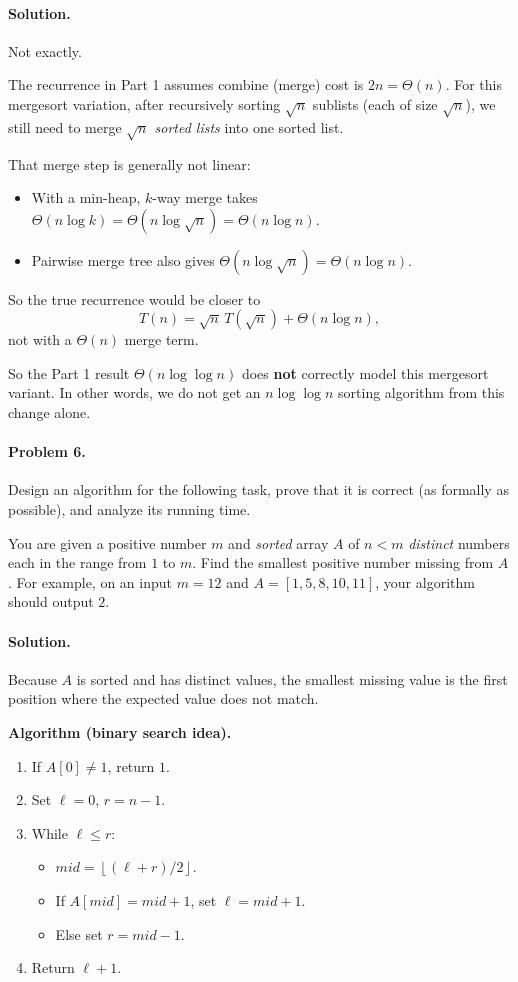 \documentclass[10pt]{article}
\begin{document}
\paragraph{Solution.}
Not exactly.

The recurrence in Part 1 assumes combine (merge) cost is $2n=\Theta(n)$.
For this mergesort variation, after recursively sorting $\sqrt n$ sublists (each of size $\sqrt n$), we still need to merge \emph{$\sqrt n$ sorted lists} into one sorted list.

That merge step is generally not linear:
\begin{itemize}
    \item With a min-heap, $k$-way merge takes $\Theta(n\log k)=\Theta(n\log\sqrt n)=\Theta(n\log n)$.
    \item Pairwise merge tree also gives $\Theta(n\log\sqrt n)=\Theta(n\log n)$.
\end{itemize}
So the true recurrence would be closer to
\[
T(n)=\sqrt n\,T(\sqrt n)+\Theta(n\log n),
\]
not with a $\Theta(n)$ merge term.

So the Part 1 result $\Theta(n\log\log n)$ does \textbf{not} correctly model this mergesort variant. In other words, we do not get an $n\log\log n$ sorting algorithm from this change alone.

\paragraph{Problem 6.}  Design an algorithm for the following task, prove that it is correct (as formally as possible), and analyze its running time.

You are given a positive number $m$ and \emph{sorted} array $A$ of $n < m$ \emph{distinct} numbers each in the range from $1$ to $m$.  Find the smallest positive number missing from $A$.  For example, on an input $m = 12$ and $A = [1,5,8,10,11]$, your algorithm should output $2$.
\paragraph{Solution.}
Because $A$ is sorted and has distinct values, the smallest missing value is the first position where the expected value does not match.

\textbf{Algorithm (binary search idea).}
\begin{enumerate}[label=\arabic*.]
    \item If $A[0]\ne 1$, return $1$.
    \item Set $\ell=0$, $r=n-1$.
    \item While $\ell\le r$:
    \begin{itemize}
        \item $mid=\left\lfloor(\ell+r)/2\right\rfloor$.
        \item If $A[mid]=mid+1$, set $\ell=mid+1$.
        \item Else set $r=mid-1$.
    \end{itemize}
    \item Return $\ell+1$.
\end{enumerate}
\end{document}
